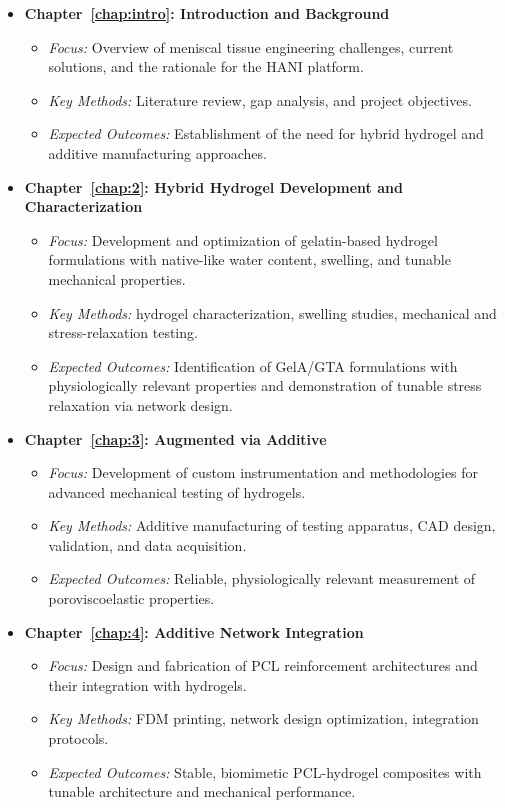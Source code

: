 \begin{itemize}
    \item \textbf{Chapter~\ref{chap:intro}: Introduction and Background}
    \begin{itemize}
        \item \textit{Focus:} Overview of meniscal tissue engineering challenges, current solutions, and the rationale for the HANI platform.
        \item \textit{Key Methods:} Literature review, gap analysis, and project objectives.
        \item \textit{Expected Outcomes:} Establishment of the need for hybrid hydrogel and additive manufacturing approaches.
    \end{itemize}
    
    \item \textbf{Chapter~\ref{chap:2}: Hybrid Hydrogel Development and Characterization}
    \begin{itemize}
        \item \textit{Focus:} Development and optimization of gelatin-based hydrogel formulations with native-like water content, swelling, and tunable mechanical properties.
        \item \textit{Key Methods:} hydrogel characterization, swelling studies, mechanical and stress-relaxation testing.
        \item \textit{Expected Outcomes:} Identification of GelA/GTA formulations with physiologically relevant properties and demonstration of tunable stress relaxation via network design.
    \end{itemize}
    
    \item \textbf{Chapter~\ref{chap:3}: Augmented via Additive}
    \begin{itemize}
        \item \textit{Focus:} Development of custom instrumentation and methodologies for advanced mechanical testing of hydrogels.
        \item \textit{Key Methods:} Additive manufacturing of testing apparatus, CAD design, validation, and data acquisition.
        \item \textit{Expected Outcomes:} Reliable, physiologically relevant measurement of poroviscoelastic properties.
    \end{itemize}
    
    \item \textbf{Chapter~\ref{chap:4}: Additive Network Integration}
    \begin{itemize}
        \item \textit{Focus:} Design and fabrication of PCL reinforcement architectures and their integration with hydrogels.
        \item \textit{Key Methods:} FDM printing, network design optimization, integration protocols.
        \item \textit{Expected Outcomes:} Stable, biomimetic PCL-hydrogel composites with tunable architecture and mechanical performance.
    \end{itemize}
    

\end{itemize}
